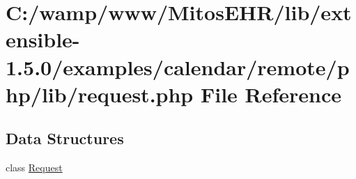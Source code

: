 \hypertarget{request_8php}{\section{\-C\-:/wamp/www/\-Mitos\-E\-H\-R/lib/extensible-\/1.5.0/examples/calendar/remote/php/lib/request.php \-File \-Reference}
\label{request_8php}
}
\subsection*{\-Data \-Structures}
\begin{DoxyCompactItemize}
\item 
class \hyperlink{class_request}{\-Request}
\end{DoxyCompactItemize}
